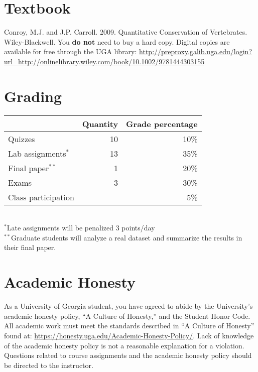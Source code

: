 \documentclass[11pt]{article}
\begin{document}
\vspace{-5mm}
\section*{Textbook}
\vspace{-2mm}
Conroy, M.J. and J.P. Carroll. 2009. Quantitative Conservation of
Vertebrates. Wiley-Blackwell. You {\bf do not} need to buy a hard
copy. Digital copies are available for free through the UGA library:
{\footnotesize \url{http://preproxy.galib.uga.edu/login?url=http://onlinelibrary.wiley.com/book/10.1002/9781444303155}}

\vspace{-5mm}
\section*{Grading}
\vspace{-2mm}
\begin{center}
  \begin{tabular}[h!]{lrr}
    \hline
                              & Quantity & Grade percentage      \\
    \hline
    Quizzes                   & 10       & 10\%                  \\
    Lab assignments$^*$       & 13       & 35\%                  \\
    Final paper$^{**}$         & 1        & 20\%                  \\
    Exams                     & 3        & 30\%                  \\
    Class participation       &          & 5\%                   \\
    \hline
  \end{tabular}                                                  \\
  \small
\hspace{0mm} $^*$Late assignments will be penalized 3 points/day \\ %
\hspace{0mm} $^{**}$Graduate students will analyze a real dataset and
summarize the results in their final paper.
\end{center}



\vspace{-5mm}
\section*{Academic Honesty}
\vspace{-2mm}
As a University of Georgia student, you have agreed to abide by the
University's academic honesty policy, ``A Culture of Honesty,'' and
the Student Honor Code. All academic work must meet the standards
described in ``A Culture of Honesty'' found at:
\url{https://honesty.uga.edu/Academic-Honesty-Policy/}. Lack of
knowledge of the academic honesty policy is not a reasonable
explanation for a violation. Questions related to course assignments
and the academic honesty policy should be directed to the instructor.
\end{document}
